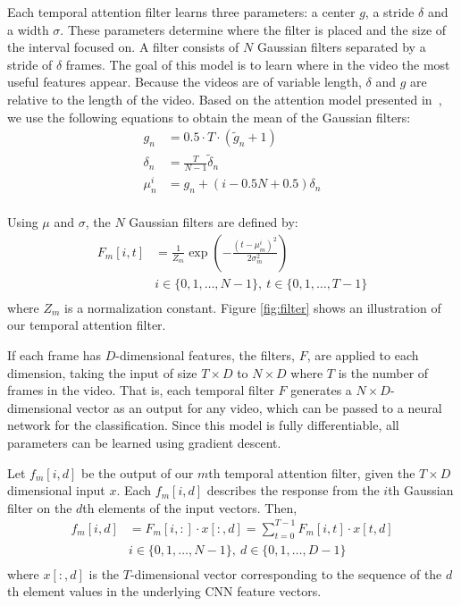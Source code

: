 \documentclass[letterpaper]{article}
\begin{document}
Each temporal attention filter learns three parameters: a center $g$, a stride $\delta$ and a width $\sigma$. These parameters determine where the filter is placed and the size of the interval focused on. A filter consists of $N$ Gaussian filters separated by a stride of $\delta$ frames. The goal of this model is to learn where in the video the most useful features appear. Because the videos are of variable length, $\delta$ and $g$ are relative to the length of the video. Based on the attention model presented in~\cite{attention15}, we use the following equations to obtain the mean of the Gaussian filters:
\begin{equation} \label{eq:mrf_match}
\begin{split}
g_n &= 0.5\cdot T \cdot (\widetilde{g}_n + 1) \\
\delta_n &= \frac{T}{N-1} \widetilde{\delta}_n \\
\mu_n^i &= g_n + (i - 0.5N +0.5)\delta_n \\
\end{split}
\end{equation}

Using $\mu$ and $\sigma$, the $N$ Gaussian filters are defined by:
\begin{equation} \label{eq:mrf_match}
\begin{split}
F_m[i,t] &= \frac{1}{Z_{m}} \exp(-\frac{(t-\mu_m^i)^2}{2\sigma_m^2}) \\
& i\in\{0,1,\ldots,N-1\},~ t\in\{0,1,\ldots,T-1\} \\
\end{split}
\end{equation}
where $Z_m$ is a normalization constant. Figure \ref{fig:filter} shows an illustration of our temporal attention filter.

If each frame has $D$-dimensional features, the filters, $F$, are applied to each dimension, taking the input of size $T\times D$ to $N\times D$ where $T$ is the number of frames in the video. That is, each temporal filter $F$ generates a $N\times D$-dimensional vector as an output for any video, which can be passed to a neural network for the classification. Since this model is fully differentiable, all parameters can be learned using gradient descent.

Let $f_{m}[i,d]$ be the output of our $m$th temporal attention filter, given the $T\times D$ dimensional input $x$. Each $f_{m}[i,d]$ describes the response from the $i$th Gaussian filter on the $d$th elements of the input vectors. Then,
\begin{equation} \label{eq:read}
\begin{split}
f_{m}[i,d] &= F_m[i,:] \cdot x[:,d] = \sum_{t=0}^{T-1} F_m[i,t] \cdot x[t,d] \\
& i\in\{0,1,\ldots,N-1\},~ d\in\{0,1,\ldots,D-1\} \\
\end{split}
\end{equation}
where $x[:,d]$ is the $T$-dimensional vector corresponding to the sequence of the $d$th element values in the underlying CNN feature vectors.
\end{document}
